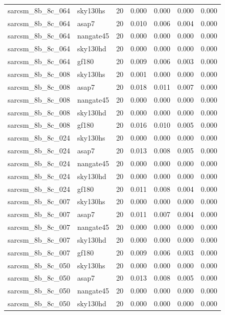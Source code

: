 \begin{tabular}{llrrrrr}
sarcsm\_8b\_8c\_064 & sky130hs & 20 & 0.000 & 0.000 & 0.000 & 0.000 \\
sarcsm\_8b\_8c\_064 & asap7 & 20 & 0.010 & 0.006 & 0.004 & 0.000 \\
sarcsm\_8b\_8c\_064 & nangate45 & 20 & 0.000 & 0.000 & 0.000 & 0.000 \\
sarcsm\_8b\_8c\_064 & sky130hd & 20 & 0.000 & 0.000 & 0.000 & 0.000 \\
sarcsm\_8b\_8c\_064 & gf180 & 20 & 0.009 & 0.006 & 0.003 & 0.000 \\
sarcsm\_8b\_8c\_008 & sky130hs & 20 & 0.001 & 0.000 & 0.000 & 0.000 \\
sarcsm\_8b\_8c\_008 & asap7 & 20 & 0.018 & 0.011 & 0.007 & 0.000 \\
sarcsm\_8b\_8c\_008 & nangate45 & 20 & 0.000 & 0.000 & 0.000 & 0.000 \\
sarcsm\_8b\_8c\_008 & sky130hd & 20 & 0.000 & 0.000 & 0.000 & 0.000 \\
sarcsm\_8b\_8c\_008 & gf180 & 20 & 0.016 & 0.010 & 0.005 & 0.000 \\
sarcsm\_8b\_8c\_024 & sky130hs & 20 & 0.000 & 0.000 & 0.000 & 0.000 \\
sarcsm\_8b\_8c\_024 & asap7 & 20 & 0.013 & 0.008 & 0.005 & 0.000 \\
sarcsm\_8b\_8c\_024 & nangate45 & 20 & 0.000 & 0.000 & 0.000 & 0.000 \\
sarcsm\_8b\_8c\_024 & sky130hd & 20 & 0.000 & 0.000 & 0.000 & 0.000 \\
sarcsm\_8b\_8c\_024 & gf180 & 20 & 0.011 & 0.008 & 0.004 & 0.000 \\
sarcsm\_8b\_8c\_007 & sky130hs & 20 & 0.000 & 0.000 & 0.000 & 0.000 \\
sarcsm\_8b\_8c\_007 & asap7 & 20 & 0.011 & 0.007 & 0.004 & 0.000 \\
sarcsm\_8b\_8c\_007 & nangate45 & 20 & 0.000 & 0.000 & 0.000 & 0.000 \\
sarcsm\_8b\_8c\_007 & sky130hd & 20 & 0.000 & 0.000 & 0.000 & 0.000 \\
sarcsm\_8b\_8c\_007 & gf180 & 20 & 0.009 & 0.006 & 0.003 & 0.000 \\
sarcsm\_8b\_8c\_050 & sky130hs & 20 & 0.000 & 0.000 & 0.000 & 0.000 \\
sarcsm\_8b\_8c\_050 & asap7 & 20 & 0.013 & 0.008 & 0.005 & 0.000 \\
sarcsm\_8b\_8c\_050 & nangate45 & 20 & 0.000 & 0.000 & 0.000 & 0.000 \\
sarcsm\_8b\_8c\_050 & sky130hd & 20 & 0.000 & 0.000 & 0.000 & 0.000 \\

\end{tabular}
